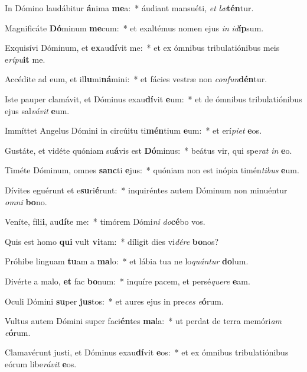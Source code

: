 \item In Dómino laudábitur \textbf{á}nima \textbf{me}a:~* áudiant mansuéti, \textit{et} \textit{læ}\textbf{tén}tur.
\item Magnificáte \textbf{Dó}minum \textbf{me}cum:~* et exaltémus nomen ejus \textit{in} \textit{id}\textbf{íp}sum.
\item Exquisívi Dóminum, et \textbf{ex}au\textbf{dí}vit me:~* et ex ómnibus tribulatiónibus meis e\textit{rí}\textit{pu}\textbf{it} me.
\item Accédite ad eum, et il\textbf{lu}mi\textbf{ná}mini:~* et fácies vestræ non \textit{con}\textit{fun}\textbf{dén}tur.
\item Iste pauper clamávit, et Dóminus exau\textbf{dí}vit \textbf{e}um:~* et de ómnibus tribulatiónibus ejus sal\textit{vá}\textit{vit} \textbf{e}um.
\item Immíttet Angelus Dómini in circúitu ti\textbf{mén}tium \textbf{e}um:~* et erí\textit{pi}\textit{et} \textbf{e}os.
\item Gustáte, et vidéte quóniam su\textbf{á}vis est \textbf{Dó}minus:~* beátus vir, qui spe\textit{rat} \textit{in} \textbf{e}o.
\item Timéte Dóminum, omnes \textbf{sanc}ti \textbf{e}jus:~* quóniam non est inópia timén\textit{ti}\textit{bus} \textbf{e}um.
\item Dívites eguérunt et e\textbf{su}ri\textbf{é}runt:~* inquiréntes autem Dóminum non minuéntur \textit{om}\textit{ni} \textbf{bo}no.
\item Veníte, fíli\textbf{i}, au\textbf{dí}te me:~* timórem Dómi\textit{ni} \textit{do}\textbf{cé}bo vos.
\item Quis est homo \textbf{qui} vult \textbf{vi}tam:~* díligit dies vi\textit{dé}\textit{re} \textbf{bo}nos?
\item Próhibe linguam \textbf{tu}am a \textbf{ma}lo:~* et lábia tua ne lo\textit{quán}\textit{tur} \textbf{do}lum.
\item Divérte a malo, \textbf{et} fac \textbf{bo}num:~* inquíre pacem, et persé\textit{que}\textit{re} \textbf{e}am.
\item Oculi Dómini \textbf{su}per \textbf{jus}tos:~* et aures ejus in pre\textit{ces} \textit{e}\textbf{ó}rum.
\item Vultus autem Dómini super faci\textbf{én}tes \textbf{ma}la:~* ut perdat de terra memóri\textit{am} \textit{e}\textbf{ó}rum.
\item Clamavérunt justi, et Dóminus exau\textbf{dí}vit \textbf{e}os:~* et ex ómnibus tribulatiónibus eórum libe\textit{rá}\textit{vit} \textbf{e}os.
